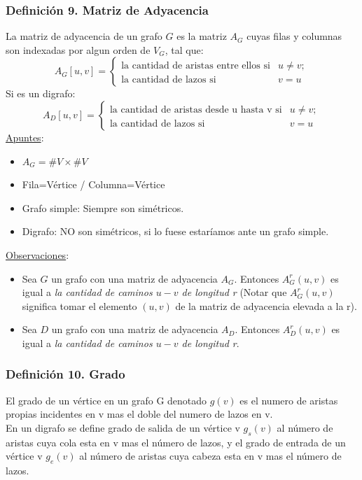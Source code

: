 \documentclass{article}
\begin{document}
\subsubsection*{Definición 9. Matriz de Adyacencia}
La matriz de adyacencia de un grafo $G$ es la matriz $A_G$ cuyas filas y columnas son indexadas por algun orden de $V_G$, tal que:
\begin{equation*}
    A_G[u,v]=
    \begin{cases}
        \text{la cantidad de aristas entre ellos si} &u\neq v; \\
        \text{la cantidad de lazos si} &v = u
    \end{cases}
\end{equation*}
Si es un digrafo:
\begin{equation*}
    A_D[u,v]=
    \begin{cases}
        \text{la cantidad de aristas desde u hasta v si} &u\neq v; \\
        \text{la cantidad de lazos si} &v = u
    \end{cases}
\end{equation*}
\underline{Apuntes}:
\begin{itemize}
    \item $A_G = \#V \times \#V$
    \item Fila=Vértice / Columna=Vértice
    \item Grafo simple: Siempre son simétricos.
    \item Digrafo: NO son simétricos, si lo fuese estaríamos ante un grafo simple.
\end{itemize}
\underline{Observaciones}:
\begin{itemize}
    \item Sea $G$ un grafo con una matriz de adyacencia $A_G$.
    Entonces $A_G^r(u,v)$ es igual a \emph{la cantidad de caminos $u-v$ de longitud r}
    (Notar que $A_G^r(u,v)$ significa tomar el elemento $(u,v)$ de la matriz de adyacencia elevada a la r).
    \item Sea $D$ un grafo con una matriz de adyacencia $A_D$.
    Entonces $A_D^r(u,v)$ es igual a \emph{la cantidad de caminos $u-v$ de longitud r}.
\end{itemize}

\subsubsection*{Definición 10. Grado}
El grado de un vértice en un grafo G denotado $g(v)$ es el numero de aristas propias
incidentes en v mas el doble del numero de lazos en v.
\\ En un digrafo se define grado de salida de un vértice v $g_s(v)$ al número de aristas cuya cola
esta en v mas el número de lazos, y el grado de entrada de un vértice v $g_e(v)$ al número
de aristas cuya cabeza esta en v mas el número de lazos.
\end{document}
